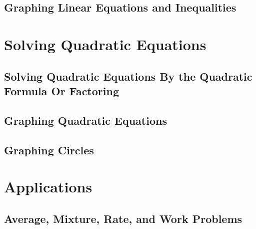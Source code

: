 \documentclass[
	11pt, %
	handout,
]{beamer}
\begin{document}

\subsection{Graphing Linear Equations and Inequalities}







\section{Solving Quadratic Equations}


\subsection{Solving Quadratic Equations By the Quadratic Formula Or Factoring}


\subsection{Graphing Quadratic Equations}


\subsection{Graphing Circles}





\section{Applications}


\subsection{Average, Mixture, Rate, and Work Problems}
\end{document}
